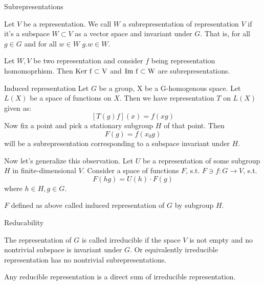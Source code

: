\documentclass{beamer}
\def\ker{\rm Ker\ }
\def\im{\rm Im}
\begin{document}
\begin{frame}{Subrepresentations}
    \begin{definition}
        Let $V$ be a representation. We call $W$ a subrepresentation of representation $V$ if it's a subspace $W\subset V$ as a vector space and invariant under $G$. That is, for all $g \in G$ and for all $w \in W$ $g.w \in W$.
    \end{definition}

    \begin{lemma}
        Let $W, V$ be two representation and consider $f$ being representation homomoprhism. Then $\ker f \subset V$ and $\im \ f \subset W$ are subrepresentations.

    \end{lemma}

\end{frame}

\begin{frame}{Induced representation}
    Let $G$ be a group, X be a G-homogenous space. Let $L(X)$ be a space of functions on $X$. Then we have representation $T$ on $L(X)$ given as:
    $$\left[T(g) f\right] (x) = f (xg) $$
    Now fix a point and pick a stationary subgroup $H$ of that point. Then
    $$ F(g) = f(x_0 g) $$
    will be a subrepresentation corresponding to a subspace invariant under $H$.

    Now let's generalize this observation. Let $U$ be a representation of some subgroup $H$ in finite-dimensional $V$.
    Consider a space of functions $F$, s.t. $F\ni f: G \to V$, s.t.
    $$F(hg) = U(h) \cdot F(g)$$
    where $h\in H, g \in G$.

    \begin{definition}
        $F$ defined as above called induced representation of $G$ by subgroup $H$.
    \end{definition}
\end{frame}

\begin{frame}{Reducability}
    \begin{definition}
        The representation of $G$ is called irreducible if the space $V$ is not empty and no nontrivial subspace is invariant under $G$. Or equivalently irreducible representation has no nontrivial subrepresentations.
    \end{definition}
    \begin{lemma}
        Any reducible representation is a direct sum of irreducible representation.
    \end{lemma}
\end{frame}
\end{document}
